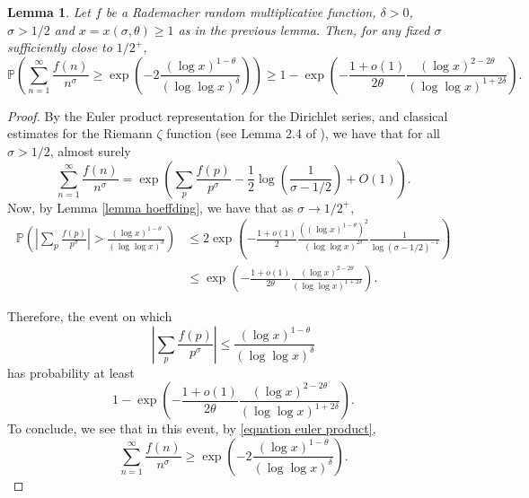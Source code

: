 \documentclass[reqno0,12pt]{amsart}
\newtheorem{lemma}{Lemma}[section]
\theoremstyle{remark}
\newcommand{\PP}{\mathbb{P}}
\begin{document}
\begin{lemma}\label{lemma euler product probability} Let $f$ be a Rademacher random multiplicative function, $\delta>0$, $\sigma>1/2$ and $x=x(\sigma,\theta)\geq 1$ as in the previous lemma. Then, for any fixed $\sigma$ sufficiently close to $1/2^{+}$,
$$\PP\left(\sum_{n=1}^\infty\frac{f(n)}{n^\sigma}\geq \exp\left(-2\frac{(\log x)^{1-\theta}}{(\log\log x)^{\delta}}\right)\right)\geq 1-\exp\left(-\frac{1+o(1)}{2\theta}\frac{(\log x)^{2-2\theta}}{(\log\log x)^{1+2\delta}}\right).$$
\end{lemma}
\begin{proof}
By the Euler product representation for the Dirichlet series, and classical estimates for the Riemann $\zeta$ function (see Lemma 2.4 of \cite{aymone_sign_changes}), we have that for all $\sigma>1/2$, almost surely
\begin{equation}\label{equation euler product}
\sum_{n=1}^\infty\frac{f(n)}{n^{\sigma}}=\exp\left(\sum_p\frac{f(p)}{p^{\sigma}}-\frac{1}{2}\log\left(\frac{1}{\sigma-1/2}\right)+O(1)\right).
\end{equation}
Now, by Lemma \ref{lemma hoeffding}, we have that as $\sigma\to1/2^+$,
\begin{align*}
\PP\left(\left|\sum_p\frac{f(p)}{p^{\sigma}}\right|> \frac{(\log x)^{1-\theta}}{(\log\log x)^{\delta}}\right)&\leq 2\exp\left(-\frac{1+o(1)}{2}\frac{((\log x)^{1-\theta})^{2}}{(\log\log x)^{2\delta}}\frac{1}{\log(\sigma-1/2)^{-1}}\right)\\
&\leq \exp\left(-\frac{1+o(1)}{2\theta}\frac{(\log x)^{2-2\theta}}{(\log\log x)^{1+2\delta}}\right).
\end{align*}

Therefore, the event on which
$$\left|\sum_p\frac{f(p)}{p^{\sigma}}\right|\leq \frac{(\log x)^{1-\theta}}{(\log\log x)^{\delta}}$$
has probability at least
$$1-\exp\left(-\frac{1+o(1)}{2\theta}\frac{(\log x)^{2-2\theta}}{(\log\log x)^{1+2\delta}}\right).$$
To conclude, we see that in this event, by \eqref{equation euler product}, 
$$\sum_{n=1}^\infty\frac{f(n)}{n^\sigma}\geq \exp\left(-2\frac{(\log x)^{1-\theta}}{(\log\log x)^{\delta}}\right).$$
\end{proof}
\end{document}
